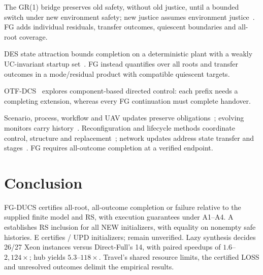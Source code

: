 \documentclass[acmsmall,screen,review,anonymous]{acmart}
\begin{document}
The GR(1) bridge preserves old safety, without old justice, until a bounded switch under new environment safety; new justice assumes environment justice~\cite[Def.~3.1]{Amram2022GR1DynamicUpdate}. FG adds individual residuals, transfer outcomes, quiescent boundaries and all-root coverage.

DES state attraction bounds completion on a deterministic plant with a weakly UC-invariant startup set~\cite[Def.~2, Thm.~1]{NooruldeenSchmidt2015}. FG instead quantifies over all roots and transfer outcomes in a mode/residual product with compatible quiescent targets.

OTF-DCS~\cite[Defs.~3--4]{CiolekEtAl2023OTFDCS} explores component-based directed control: each prefix needs a completing extension, whereas every FG continuation must complete handover.

Scenario, process, workflow and UAV updates preserve obligations~\cite{Ghezzi2012DynamicScenarioUpdate,PanzicaLaManna2013CorrectnessDynamicUpdates,NahabedianEtAl2022Business,Sokolowski2022DynamicWorkflowUpdates,ZudaireEtAl2022UAV}; evolving monitors carry history~\cite{CarwehlEtAl2023ChangingRequirements,KristensenEtAl2026DynSRV}. Reconfiguration and lifecycle methods coordinate control, structure and replacement~\cite{DelavalRutten2010Reconfiguration,KhakpourArbabRutten2016Reconfiguration,BresolinLanese2021PropertyPreservingUpdates,DiCosmoEtAl2014Aeolus,ChardetEtAl2021Concerto,RobillardCoullon2022Planning}; network updates address state transfer and stages~\cite{SaurEtAl2016Morpheus,McClurgEtAl2015NetworkUpdates,QiuEtAl2023FlexPlan}. FG requires all-outcome completion at a verified endpoint.

\FloatBarrier
\section{Conclusion}
\label{sec:conclusion}

FG-DUCS certifies all-root, all-outcome completion or failure relative to the supplied finite model and RS, with execution guarantees under A1--A4. A establishes RS inclusion for all \RSAExactNew{} NEW initializers, with equality on nonempty safe histories. E certifies \RSEExactUpd/\RSUpdOccurrences{} UPD initializers; \RSEUnverifiedUpd{} remain unverified. Lazy synthesis decides 26/27 Xeon instances versus Direct-Full's 14, with paired speedups of $1.6$--$2{,}124\times$; hub yields $5.3$--$118\times$. Travel's shared resource limits, the certified LOSS and unresolved outcomes delimit the empirical results.
\end{document}
